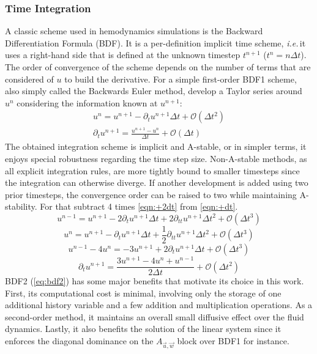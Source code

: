 \subsubsection*{Time Integration}
A classic scheme used in hemodynamics simulations is the Backward Differentiation Formula (BDF). It is a per-definition implicit time scheme, \textit{i.e.}\,it uses a right-hand side that is defined at the unknown timestep $t^{n+1}$ ($t^{n} = n\Delta t$). The order of convergence of the scheme depends on the number of terms that are considered of $u$ to build the derivative. For a simple first-order BDF1 scheme, also simply called the Backwards Euler method, develop a Taylor series around $u^{n}$ considering the information known at $u^{n+1}$:
\begin{equation*}
	\begin{split}
		u^{n} = u^{n+1} - \partial_t u^{n+1}\Delta t + \mathcal{O}(\Delta t^2)\\[1em]
		\partial_t u^{n+1} = \frac{u^{n+1} - u^{n}}{\Delta t} + \mathcal{O}(\Delta t)
	\end{split}
\end{equation*}
The obtained integration scheme is implicit and A-stable, or in simpler terms, it enjoys special robustness regarding the time step size. Non-A-stable methods, as all explicit integration rules, are more tightly bound to smaller timesteps since the integration can otherwise diverge. If another development is added using two prior timesteps, the convergence order can be raised to two while maintaining A-stability. For that subtract 4 times \autoref{eqn:+2dt} from \autoref{eqn:+dt}.
\begin{equation}
	u^{n-1} = u^{n+1} - 2\partial_t u^{n+1}\Delta t + 2\partial_{tt} u^{n+1}\Delta t^2 + \mathcal{O}(\Delta t^3)
	\label{eqn:+dt}
\end{equation}
\begin{equation}
	u^{n} = u^{n+1} - \partial_t u^{n+1}\Delta t + \frac{1}{2}\partial_{tt} u^{n+1}\Delta t^2 + \mathcal{O}(\Delta t^3)
	\label{eqn:+2dt}
\end{equation}
\begin{equation}
	u^{n-1} - 4u^{n} = -3u^{n+1} + 2\partial_t u^{n+1}\Delta t + \mathcal{O}(\Delta t^3)
\end{equation}
\begin{equation}
	\partial_t u^{n+1} = \frac{3u^{n+1} - 4u^{n} + u^{n-1}}{2\Delta t} + \mathcal{O}(\Delta t^2)
	\label{eq:bdf2}
\end{equation}
BDF2 (\autoref{eq:bdf2}) has some major benefits that motivate its choice in this work. First, its computational cost is minimal, involving only the storage of one additional history variable and a few addition and multiplication operations. As a second-order method, it maintains an overall small diffusive effect over the fluid dynamics. Lastly, it also benefits the solution of the linear system since it enforces the diagonal dominance on the $A_{\vec{u}, \vec{w}}$ block over BDF1 for instance.

